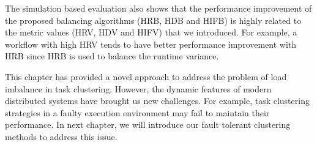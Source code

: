 The simulation based evaluation also shows that the performance improvement of the proposed balancing algorithms (HRB, HDB and HIFB) is highly related to the metric values (HRV, HDV and HIFV) that we introduced. For example, a workflow with high HRV tends to have better performance improvement with HRB since HRB is used to balance the runtime variance. 

This chapter has provided a novel approach to address the problem of load imbalance in task clustering. However, the dynamic features of modern distributed systems have brought us new challenges. For example, task clustering strategies in a faulty execution environment may fail to maintain their performance. In next chapter, we will introduce our fault tolerant clustering methods to address this issue. 

